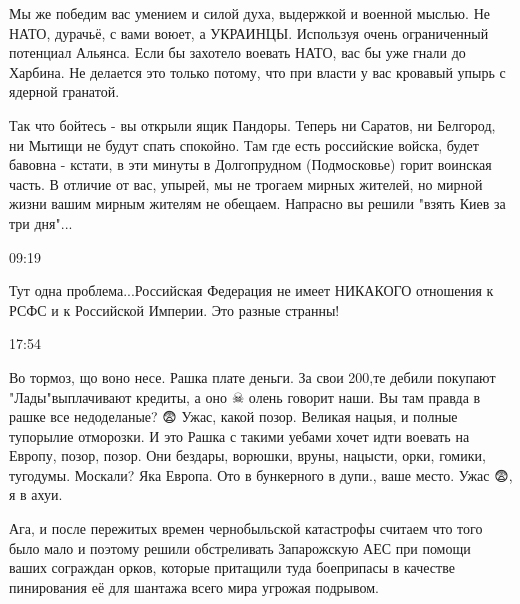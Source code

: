 {Мы же победим вас умением и силой духа, выдержкой и военной мыслью. Не НАТО,
дурачьё, с вами воюет, а УКРАИНЦЫ. Используя очень ограниченный потенциал
Альянса. Если бы захотело воевать НАТО, вас бы уже гнали до Харбина. Не
делается это только потому, что при власти у вас кровавый упырь с ядерной
гранатой.

Так что бойтесь - вы открыли ящик Пандоры. Теперь ни Саратов, ни Белгород, ни
Мытищи не будут спать спокойно. Там где есть российские войска, будет бавовна -
кстати, в эти минуты в Долгопрудном (Подмосковье) горит воинская часть. В
отличие от вас, упырей, мы не трогаем мирных жителей, но мирной жизни вашим
мирным жителям не обещаем. Напрасно вы решили "взять Киев за три дня"...

09:19

Тут одна проблема...Российская Федерация не имеет НИКАКОГО отношения к РСФС и к
Российской Империи. Это разные странны!

17:54

Во тормоз, що воно несе. Рашка плате деньги. За свои 200,те дебили покупают
"Лады"выплачивают кредиты, а оно ☠ олень говорит наши. Вы там правда в рашке
все недоделаные? 😨 Ужас, какой позор. Великая нацыя, и полные тупорылие
отморозки. И это Рашка с такими уебами хочет идти воевать на Европу, позор,
позор. Они бездары, ворюшки, вруны, нацысти, орки, гомики, тугодумы. Москали?
Яка Европа. Ото в бункерного в дупи., ваше место. Ужас 😨, я в ахуи.


Ага, и после пережитых времен чернобыльской катастрофы считаем что того было
мало и поэтому решили обстреливать Запарожскую АЕС при помощи ваших сограждан
орков, которые притащили туда боеприпасы в качестве пинирования её для шантажа
всего мира угрожая подрывом.

}
